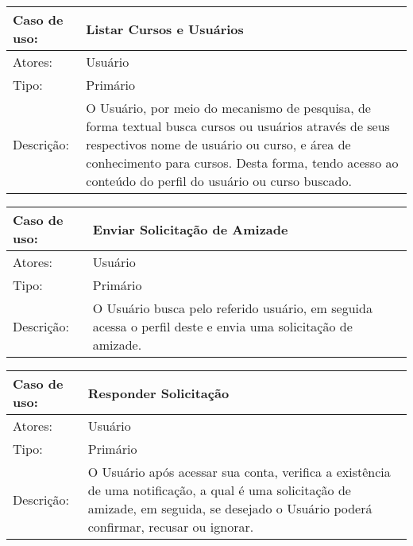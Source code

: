 \documentclass[12pt,a4paper,onecolumn,titlepage]{article}
\begin{document}
\begin{table}[h!]
\begin{center}
\begin{tabular}{p{2.5cm} p{9.5cm}}
Caso de uso: & \textbf{Listar Cursos e Usuários} \\ \hline
Atores: & Usuário \\ \hline
Tipo: & Primário \\ \hline
Descrição: & O Usuário, por meio do mecanismo de pesquisa, de forma textual busca cursos ou usuários através de seus respectivos nome de usuário ou curso, e área de conhecimento para cursos. Desta forma, tendo acesso ao conteúdo do perfil do usuário ou curso buscado.

\end{tabular}
\end{center}
\end{table}


\begin{table}[h!]
\begin{center}
\begin{tabular}{p{2.5cm} p{9.5cm}}
Caso de uso: & \textbf{Enviar Solicitação de Amizade} \\ \hline
Atores: & Usuário \\ \hline
Tipo: & Primário \\ \hline
Descrição: & O Usuário busca pelo referido usuário, em seguida acessa o perfil deste e envia uma solicitação de amizade.

\end{tabular}
\end{center}
\end{table}


\begin{table}[h!]
\begin{center}
\begin{tabular}{p{2.5cm} p{9.5cm}}
Caso de uso: & \textbf{Responder Solicitação} \\ \hline
Atores: & Usuário \\ \hline
Tipo: & Primário \\ \hline
Descrição: & O Usuário após acessar sua conta, verifica a existência de uma notificação, a qual é uma solicitação de amizade, em seguida, se desejado o Usuário poderá confirmar, recusar ou ignorar.

\end{tabular}
\end{center}
\end{table}
\end{document}
